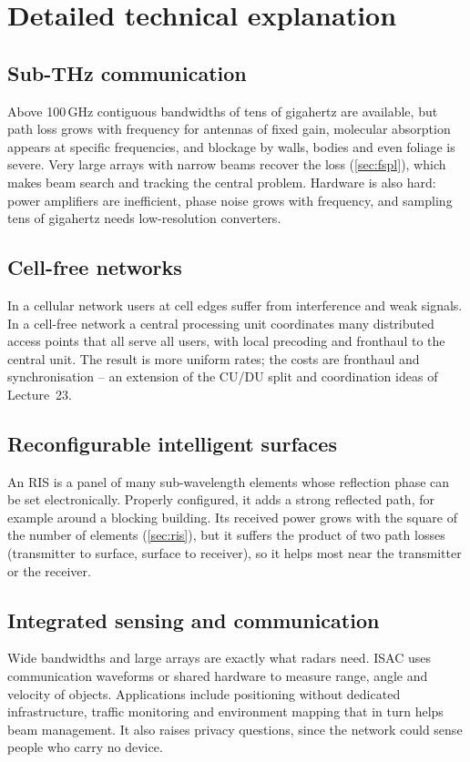 \documentclass[11pt,a4paper]{article}
\begin{document}
\section{Detailed technical explanation}

\subsection{Sub-THz communication}
Above 100\,GHz contiguous bandwidths of tens of gigahertz are available, but path loss grows with frequency for antennas of fixed gain, molecular
absorption appears at specific frequencies, and blockage by walls, bodies and even foliage is severe. Very large arrays with narrow beams
recover the loss (\cref{sec:fspl}), which makes beam search and tracking the central problem. Hardware is also hard: power amplifiers are
inefficient, phase noise grows with frequency, and sampling tens of gigahertz needs low-resolution converters.

\subsection{Cell-free networks}
In a cellular network users at cell edges suffer from interference and weak signals. In a cell-free network a central processing unit
coordinates many distributed access points that all serve all users, with local precoding and fronthaul to the central unit. The result is
more uniform rates; the costs are fronthaul and synchronisation -- an extension of the CU/DU split and coordination ideas of Lecture~23.

\subsection{Reconfigurable intelligent surfaces}
An RIS is a panel of many sub-wavelength elements whose reflection phase can be set electronically. Properly configured, it adds a strong
reflected path, for example around a blocking building. Its received power grows with the square of the number of elements
(\cref{sec:ris}), but it suffers the product of two path losses (transmitter to surface, surface to receiver), so it helps most near the
transmitter or the receiver.

\subsection{Integrated sensing and communication}
Wide bandwidths and large arrays are exactly what radars need. ISAC uses communication waveforms or shared hardware to measure range, angle
and velocity of objects. Applications include positioning without dedicated infrastructure, traffic monitoring and environment mapping that in
turn helps beam management. It also raises privacy questions, since the network could sense people who carry no device.
\end{document}
